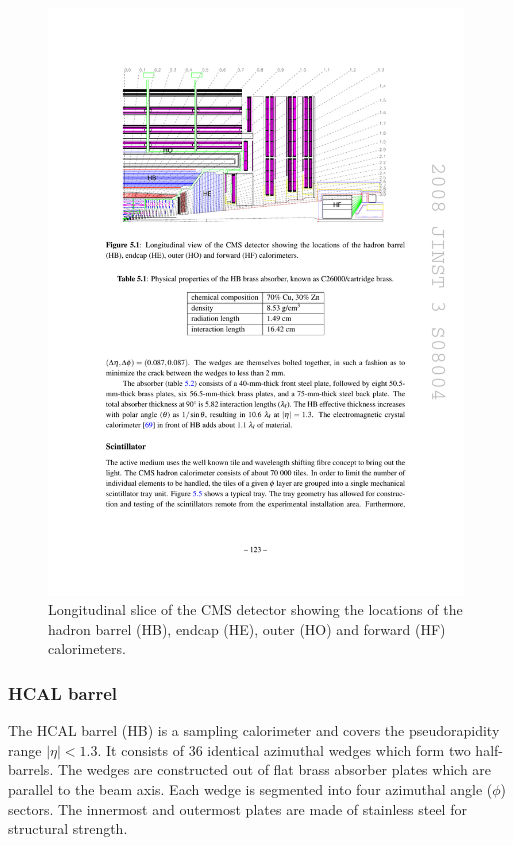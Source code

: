 \begin{figure}
\centering
\includegraphics[width=0.98\textwidth]{figures/hcalslice.pdf}
\caption{Longitudinal slice of the CMS detector showing the locations of the hadron barrel
(HB), endcap (HE), outer (HO) and forward (HF) calorimeters.}
\label{fig:hcalslice}
\end{figure}

\subsubsection{HCAL barrel}
The HCAL barrel (HB) is a sampling calorimeter and covers the pseudorapidity range $|\eta| < 1.3$.
It consists of 36 identical azimuthal wedges which form two half-barrels. 
The wedges are constructed out of flat brass absorber plates which are parallel
to the beam axis.  Each wedge is segmented into four azimuthal angle ($\phi$) sectors. 
The innermost and outermost plates are made of stainless steel for structural strength.

